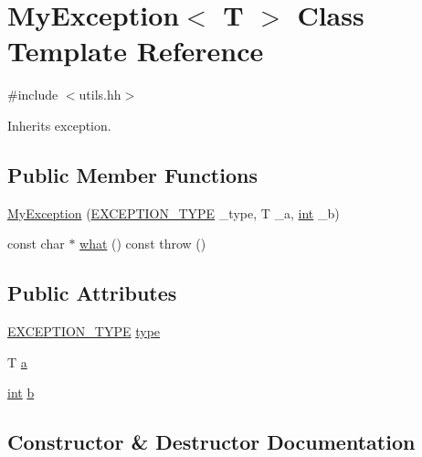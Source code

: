 \hypertarget{class_my_exception}{}\section{My\+Exception$<$ T $>$ Class Template Reference}
\label{class_my_exception}


{\ttfamily \#include $<$utils.\+hh$>$}



Inherits exception.

\subsection*{Public Member Functions}
\begin{DoxyCompactItemize}
\item 
\mbox{\hyperlink{class_my_exception_ae54d35c805c5d632a9a34dfb04edde5a}{My\+Exception}} (\mbox{\hyperlink{utils_8hh_af26a5d951fd6ab4b44e6cd8425aa0383}{E\+X\+C\+E\+P\+T\+I\+O\+N\+\_\+\+T\+Y\+PE}} \+\_\+type, T \+\_\+a, \mbox{\hyperlink{draw_8hh_aa620a13339ac3a1177c86edc549fda9b}{int}} \+\_\+b)
\item 
const char $\ast$ \mbox{\hyperlink{class_my_exception_ad0a4ef3c9897eb136fa37aec342406fd}{what}} () const  throw ()
\end{DoxyCompactItemize}
\subsection*{Public Attributes}
\begin{DoxyCompactItemize}
\item 
\mbox{\hyperlink{utils_8hh_af26a5d951fd6ab4b44e6cd8425aa0383}{E\+X\+C\+E\+P\+T\+I\+O\+N\+\_\+\+T\+Y\+PE}} \mbox{\hyperlink{class_my_exception_a6a422c140340e945df9548f548ea0ed8}{type}}
\item 
T \mbox{\hyperlink{class_my_exception_ae4b514f28c88dc08e7a27bc04f3b4655}{a}}
\item 
\mbox{\hyperlink{draw_8hh_aa620a13339ac3a1177c86edc549fda9b}{int}} \mbox{\hyperlink{class_my_exception_a42f4256beeac79f7ad8ad9682a9b83ee}{b}}
\end{DoxyCompactItemize}


\subsection{Constructor \& Destructor Documentation}
\mbox{\label{class_my_exception_ae54d35c805c5d632a9a34dfb04edde5a}} 
